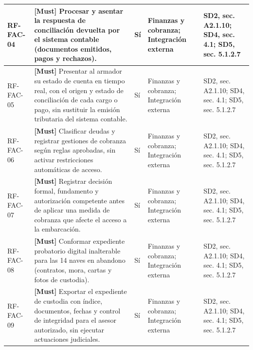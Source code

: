 \begin{paginaHorizontalSynaptix}
\begin{longtable}{|L{0.09\AnchoMatrizTDoce}|L{0.385\AnchoMatrizTDoce}|L{0.065\AnchoMatrizTDoce}|L{0.18\AnchoMatrizTDoce}|L{0.28\AnchoMatrizTDoce}|}
RF-\allowbreak{}FAC-\allowbreak{}04 &
\textbf{[Must]} Procesar y asentar la respuesta de conciliación devuelta por el sistema contable (documentos emitidos, pagos y rechazos). &
Sí &
Finanzas y cobranza; Integración externa &
SD2, sec. A2.1.10; SD4, sec. 4.1; SD5, sec. 5.1.2.7 \\ \hline

RF-\allowbreak{}FAC-\allowbreak{}05 &
\textbf{[Must]} Presentar al armador su estado de cuenta en tiempo real, con el origen y estado de conciliación de cada cargo o pago, sin sustituir la emisión tributaria del sistema contable. &
Sí &
Finanzas y cobranza; Integración externa &
SD2, sec. A2.1.10; SD4, sec. 4.1; SD5, sec. 5.1.2.7 \\ \hline

RF-\allowbreak{}FAC-\allowbreak{}06 &
\textbf{[Must]} Clasificar deudas y registrar gestiones de cobranza según reglas aprobadas, sin activar restricciones automáticas de acceso. &
Sí &
Finanzas y cobranza; Integración externa &
SD2, sec. A2.1.10; SD4, sec. 4.1; SD5, sec. 5.1.2.7 \\ \hline

RF-\allowbreak{}FAC-\allowbreak{}07 &
\textbf{[Must]} Registrar decisión formal, fundamento y autorización competente antes de aplicar una medida de cobranza que afecte el acceso a la embarcación. &
Sí &
Finanzas y cobranza; Integración externa &
SD2, sec. A2.1.10; SD4, sec. 4.1; SD5, sec. 5.1.2.7 \\ \hline

RF-\allowbreak{}FAC-\allowbreak{}08 &
\textbf{[Must]} Conformar expediente probatorio digital inalterable para las 14 naves en abandono (contratos, mora, cartas y fotos de custodia). &
Sí &
Finanzas y cobranza; Integración externa &
SD2, sec. A2.1.10; SD4, sec. 4.1; SD5, sec. 5.1.2.7 \\ \hline

RF-\allowbreak{}FAC-\allowbreak{}09 &
\textbf{[Must]} Exportar el expediente de custodia con índice, documentos, fechas y control de integridad para el asesor autorizado, sin ejecutar actuaciones judiciales. &
Sí &
Finanzas y cobranza; Integración externa &
SD2, sec. A2.1.10; SD4, sec. 4.1; SD5, sec. 5.1.2.7 \\ \hline
\end{longtable}



\end{paginaHorizontalSynaptix}
